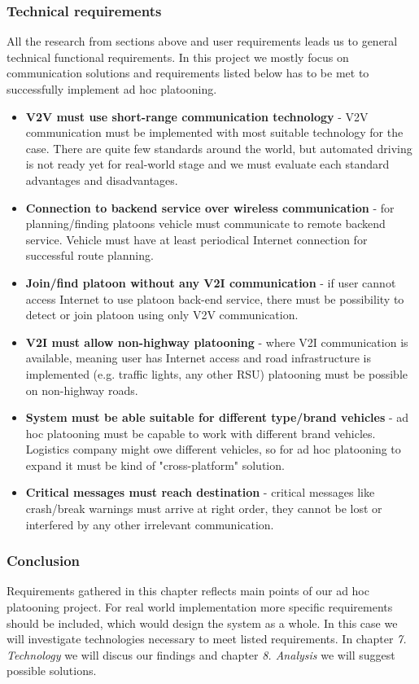 \subsubsection{Technical requirements}
%
All the research from sections above and user requirements leads us to general technical functional requirements. In this project we mostly focus on communication solutions and requirements listed below has to be met to successfully implement ad hoc platooning.
%
\begin{itemize}
    \item\textbf{V2V must use short-range communication technology} - V2V communication must be implemented with most suitable technology for the case. There are quite few standards around the world, but automated driving is not ready yet for real-world stage and we must evaluate each standard advantages and disadvantages.
    \item\textbf{Connection to backend service over wireless communication} - for planning/finding platoons vehicle must communicate to remote backend service. Vehicle must have at least periodical Internet connection for successful route planning.
    \item\textbf{Join/find platoon without any V2I communication} - if user cannot access Internet to use platoon back-end service, there must be possibility to detect or join platoon using only V2V communication.
    \item\textbf{V2I must allow non-highway platooning} - where V2I communication is available, meaning user has Internet access and road infrastructure is implemented (e.g. traffic lights, any other RSU) platooning must be possible on non-highway roads. 
    \item\textbf{System must be able suitable for different type/brand vehicles} - ad hoc platooning must be capable to work with different brand vehicles. Logistics company might owe different vehicles, so for ad hoc platooning to expand it must be kind of "cross-platform" solution.
    \item\textbf{Critical messages must reach destination} - critical messages like crash/break warnings must arrive at right order, they cannot be lost or interfered by any other irrelevant communication.
\end{itemize}\par
%
\subsubsection{Conclusion}
Requirements gathered in this chapter reflects main points of our ad hoc platooning project. For real world implementation more specific requirements should be included, which would design the system as a whole. In this case we will investigate technologies necessary to meet listed requirements. In chapter \emph{7. Technology} we will discus our findings and chapter \emph{8. Analysis} we will suggest possible solutions.